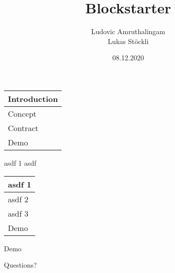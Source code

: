 \documentclass{beamer}
\title              {Blockstarter}
\author             {Ludovic Amruthalingam\\Lukas Stöckli}
\institute          {University of Basel}
\date               {08.12.2020}
\begin{document}
\begin{frame}[t,plain]
	\titlepage
\end{frame}




\begin{frame}
	\begin{tabularx}{\textwidth}{X}
		\hline
		\rowcolor{hcolor}
		Introduction\\
		\hline
		Concept\\
		\hline
		Contract\\
		\hline
		Demo\\
		\hline
	\end{tabularx}
\end{frame}




\begin{frame}{asdf 1}
asdf
\end{frame}



\begin{frame}
	\begin{tabularx}{\textwidth}{X}
		\hline
		asdf 1\\
		\hline
		\rowcolor{hcolor}
		asdf 2\\
		\hline
		asdf 3\\
		\hline
		Demo\\
		\hline
	\end{tabularx}
\end{frame}



\begin{frame}
	\begin{center}
		\huge{Demo}
	\end{center}
\end{frame}



\begin{frame}
	\begin{center}
		\huge{Questions?}
	\end{center}
\end{frame}
\end{document}
